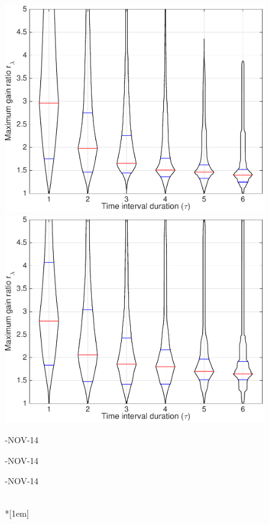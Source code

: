 \begin{figure}
\includegraphics[width=\mylength]{dist/20141111-maxGain-local-relativePerf} 
\includegraphics[width=\mylength]{dist/20141113-maxGain-local-relativePerf} \\
\parbox{\mylength}{-NOV-14}
\parbox{\mylength}{-NOV-14}
\parbox{\mylength}{-NOV-14} \\*[1em]

\end{figure}
